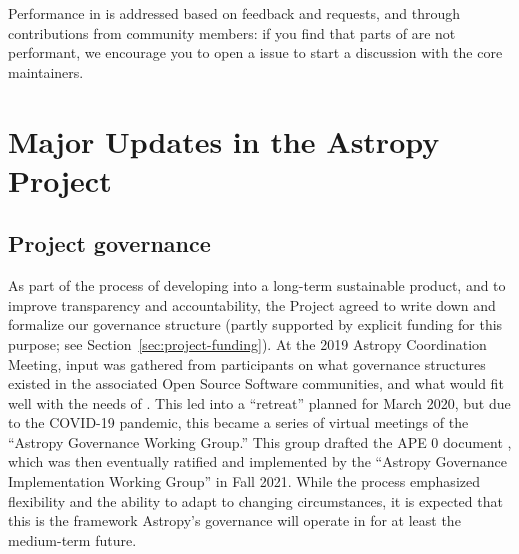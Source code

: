 \documentclass[modern]{aastex631}
\newcommand{\secauthor}[1]{{\color{blue}Author:~\textit{#1}}}
\begin{document}
Performance in \astropypkg is addressed based on feedback and requests, and
through contributions from community members: if you find that parts of
\astropypkg are not performant, we encourage you to open a \github issue to
start a discussion with the \astropypkg core maintainers.


\section{Major Updates in the Astropy Project} \label{sec:project-updates}

\subsection{Project governance} \label{sec:project-governance}



As part of the process of developing \astropypkg into a long-term sustainable
product, and to improve transparency and accountability, the Project agreed to
write down and formalize our governance structure (partly supported by explicit
funding for this purpose; see Section~\ref{sec:project-funding}). At the 2019
Astropy Coordination Meeting, input was gathered from participants on what governance
structures existed in the associated Open Source Software communities, and what
would fit well with the needs of \astropy. This led into a ``retreat'' planned
for March 2020, but due to the COVID-19 pandemic, this became a series of
virtual meetings of the ``Astropy Governance Working Group.'' This group
drafted the APE 0 document \citep{ape0}, which was then eventually ratified and
implemented by the ``Astropy Governance Implementation Working Group'' in Fall
2021. While the process emphasized flexibility and the ability to adapt to
changing circumstances, it is expected that this is the framework Astropy's
governance will operate in for at least the medium-term future.
\end{document}
